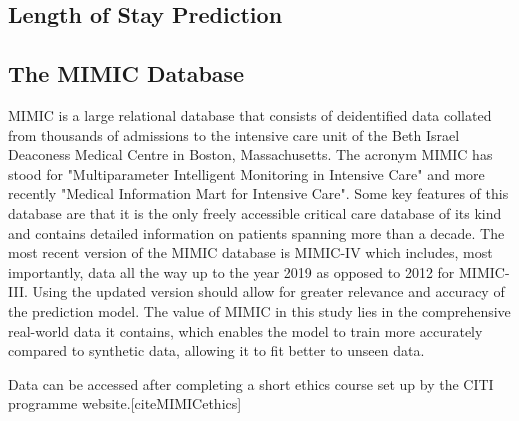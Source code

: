 \documentclass[11pt]{article}
\begin{document}

\subsection{Length of Stay Prediction}

\subsection{The MIMIC Database}
MIMIC is a large relational database that consists of deidentified data collated from thousands of admissions to the intensive care unit of the Beth Israel Deaconess Medical Centre in Boston, Massachusetts. The acronym MIMIC has stood for "Multiparameter Intelligent Monitoring in Intensive Care" and more recently "Medical Information Mart for Intensive Care". Some key features of this database are that it is the only freely accessible critical care database of its kind and contains detailed information on patients spanning more than a decade. The most recent version of the MIMIC database is MIMIC-IV which includes, most importantly, data all the way up to the year 2019 as opposed to 2012 for MIMIC-III. Using the updated version should allow for greater relevance and accuracy of the prediction model. The value of MIMIC in this study lies in the comprehensive real-world data it contains, which enables the model to train more accurately compared to synthetic data, allowing it to fit better to unseen data.

Data can be accessed after completing a short ethics course set up by the CITI programme website.[cite{MIMICethics}]

\end{document}
